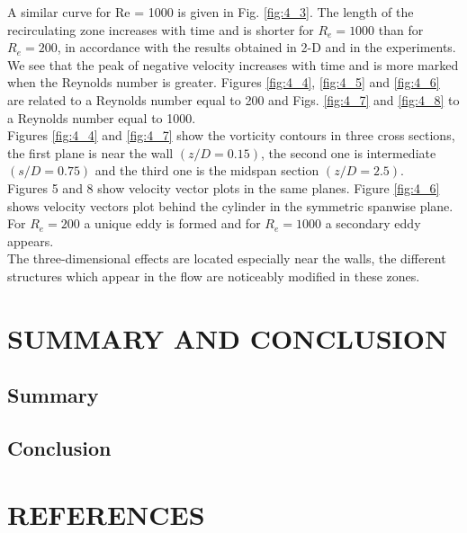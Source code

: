 \documentclass[11pt]{report}
\begin{document}
	A similar curve for Re = 1000 is given in Fig. \ref{fig:4_3}. The length of the recirculating zone increases with time and is shorter for $R_e = 1000$ than for $R_e = 200$, in accordance with the results obtained in 2-D and in the experiments. We see that the peak of negative velocity increases with time and is more marked when the Reynolds number is greater.
	Figures \ref{fig:4_4}, \ref{fig:4_5} and \ref{fig:4_6} are related to a Reynolds number equal to 200 and Figs. \ref{fig:4_7} and \ref{fig:4_8} to a Reynolds number equal to 1000. 
	\\Figures \ref{fig:4_4} and \ref{fig:4_7} show the vorticity contours in three cross sections, the first plane is near the wall $(z/D = 0.15)$, the second one is intermediate $(s/D = 0.75)$ and the third one is the midspan section $(z/D = 2.5)$. \\
	Figures 5 and 8 show velocity vector plots in the same planes. Figure \ref{fig:4_6} shows velocity vectors plot behind the cylinder in the symmetric spanwise plane. For $R_e = 200$ a unique eddy is formed and for $R_e = 1000$ a secondary eddy appears.\\
	The three-dimensional effects are located especially near the walls, the different structures which appear in the flow are noticeably modified in these zones.
	
	
	
	
	
	\chapter{SUMMARY AND CONCLUSION}
	\section{Summary}
	
	
	\section{Conclusion}
	
	

	
	\chapter*{REFERENCES}
	
	\begin{description}
		\item 
	\end{description}
	
\end{document}
